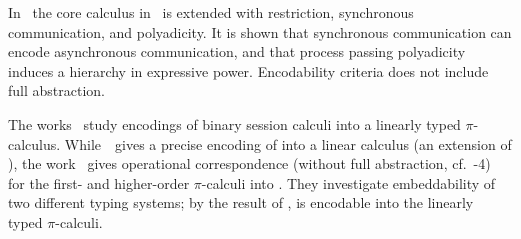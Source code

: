 In~\cite{DBLP:conf/icalp/LanesePSS10}
the core calculus in~\cite{DBLP:journals/iandc/LanesePSS11} is extended with restriction,
synchronous communication, and polyadicity. It is shown that 
synchronous communication can encode asynchronous communication, %
and that process passing polyadicity induces a hierarchy in expressive power.
Encodability criteria does not include full abstraction.

The works~\cite{DemangeonH11,Dardha:2012:STR:2370776.2370794} 
study encodings of binary session calculi into a linearly typed $\pi$-calculus. 
While~\cite{DemangeonH11}~gives a precise encoding of \sessp into a linear calculus 
(an extension of \cite{BHY}),  
the work~\cite{Dardha:2012:STR:2370776.2370794} 
gives operational correspondence (without full abstraction, cf.~-4)
for the first- and higher-order 
$\pi$-calculi into \cite{LinearPi}. 
They investigate embeddability of two different typing systems;
by the result of \cite{DemangeonH11}, 
\HOpp is encodable  into the linearly typed $\pi$-calculi.     

